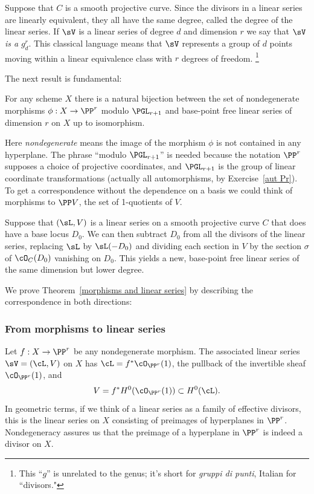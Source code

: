Suppose that $C$ is a smooth projective curve. Since the divisors in a linear series are linearly equivalent, they all have the same 
degree, called the degree of the linear series. If $\sV$ is a linear
series of degree $d$ and dimension $r$ we say that \emph{$\sV$ is a}
$g^r_d$.
%
This classical  language means that $\sV$ 
represents a group of $d$
points moving within a linear equivalence class with $r$ degrees
of freedom.%
\footnote{
This ``$g$'' is unrelated to the genus; 
it's short for \emph{gruppi di punti}, Italian for ``divisors."}

The next result is fundamental:

\begin{theorem}\label{morphisms and linear series}
For any scheme $X$ there is a natural bijection between the set of
nondegenerate morphisms $\phi : X \to \PP^r$ modulo $\PGL_{r+1}$ and
base-point free linear series of dimension $r$ on $X$ up to isomorphism. 
\end{theorem}

Here \emph{nondegenerate} means the image of the morphism $\phi$ is
not contained in any hyperplane. The phrase ``modulo $\PGL_{r+1}$'' is
needed because the notation $\PP^r$ supposes a choice of projective
coordinates, and 
$\PGL_{r+1}$ is the group of linear coordinate transformations (actually all automorphisms, by Exercise~\ref{aut Pr}).
To get a correspondence without the dependence on a basis we could think of morphisms to $\PP V$, the set of 1-quotients of $V$.

Suppose that $(\sL, V)$ is a linear series on a smooth projective curve $C$ that does have a base locus $D_0$. We can then subtract $D_0$ from all the divisors of the linear series, replacing $\sL$ by $\sL(-D_0)$ and dividing each section in $V$
by the section $\sigma$ of $\cO_C(D_0)$ vanishing on $D_0$.
This yields
a new, base-point free linear series of the same dimension 
but lower degree.

We prove
Theorem~\ref{morphisms and linear series} 
by describing the correspondence in both directions:

\subsubsection*{From morphisms to linear series}
Let 
$f : X \to \PP^r$ be any nondegenerate morphism. The associated linear series $\sV = (\cL, V)$ on $X$ has $\cL = f^*\cO_{\PP^r}(1)$, the pullback of the invertible sheaf $\cO_{\PP^r}(1)$, and 
$$
V = f^*H^0(\cO_{\PP^r}(1)) \subset H^0(\cL).
$$
In geometric terms, if we think of a linear series as a family of
effective divisors, this is the linear series on $X$ consisting of
preimages of hyperplanes in $\PP^r$. 
Nondegeneracy assures us that the preimage of 
a hyperplane in $\PP^r$ is indeed a divisor on $X$.

